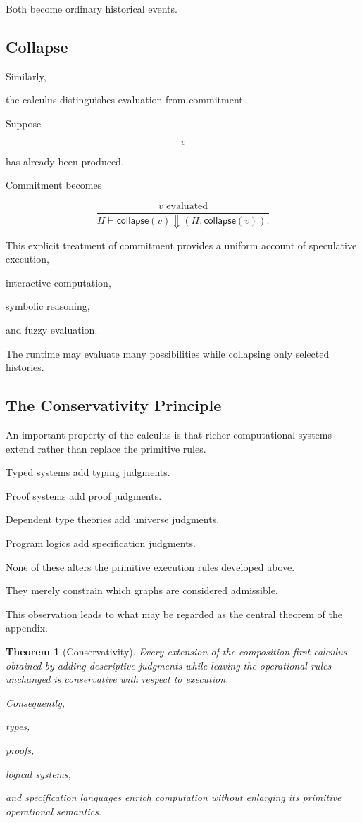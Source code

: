 \documentclass[12pt,oneside]{article}
\newtheorem{theorem}[definition]{Theorem}
\newcommand{\Collapse}{\mathsf{collapse}}
\begin{document}
Both become ordinary historical events.

\subsection{Collapse}

Similarly,

the calculus distinguishes evaluation from commitment.

Suppose

\[
v
\]

has already been produced.

Commitment becomes

\[
\frac{
v
\text{ evaluated}
}
{
H
\vdash
\Collapse(v)
\Downarrow
(H,\Collapse(v)).
}
\]

This explicit treatment of commitment provides a uniform account of speculative execution,

interactive computation,

symbolic reasoning,

and fuzzy evaluation.

The runtime may evaluate many possibilities while collapsing only selected histories.

\subsection{The Conservativity Principle}

An important property of the calculus is that richer computational systems extend rather than replace the primitive rules.

Typed systems add typing judgments.

Proof systems add proof judgments.

Dependent type theories add universe judgments.

Program logics add specification judgments.

None of these alters the primitive execution rules developed above.

They merely constrain which graphs are considered admissible.

This observation leads to what may be regarded as the central theorem of the appendix.

\begin{theorem}[Conservativity]

Every extension of the composition-first calculus obtained by adding descriptive judgments while leaving the operational rules unchanged is conservative with respect to execution.

Consequently,

types,

proofs,

logical systems,

and specification languages enrich computation without enlarging its primitive operational semantics.

\end{theorem}
\end{document}
